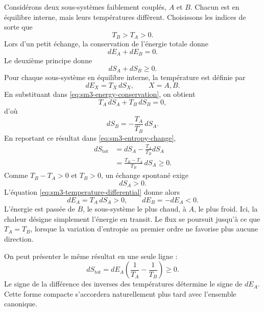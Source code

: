 Considérons deux sous-systèmes faiblement couplés, \(A\) et \(B\). Chacun est en équilibre interne, mais leurs températures diffèrent. Choisissons les indices de sorte que
\begin{equation}
 T_B>T_A>0.
 \label{eq:sm3-temperature-order}
\end{equation}
Lors d’un petit échange, la conservation de l’énergie totale donne
\begin{equation}
 dE_A+dE_B=0.
 \label{eq:sm3-energy-conservation}
\end{equation}
Le deuxième principe donne
\begin{equation}
 dS_A+dS_B\geq0.
 \label{eq:sm3-entropy-change}
\end{equation}
Pour chaque sous-système en équilibre interne, la température est définie par
\begin{equation}
 dE_X=T_X\,dS_X,
 \qquad X=A,B.
 \label{eq:sm3-temperature-differential}
\end{equation}
En substituant dans \eqref{eq:sm3-energy-conservation}, on obtient
\begin{equation}
 T_A\,dS_A+T_B\,dS_B=0,
\end{equation}
d’où
\begin{equation}
 dS_B=-\frac{T_A}{T_B}\,dS_A.
 \label{eq:sm3-dsb}
\end{equation}
En reportant ce résultat dans \eqref{eq:sm3-entropy-change},
\begin{align}
 dS_{\mathrm{tot}}
 &=dS_A-\frac{T_A}{T_B}dS_A\\
 &=\frac{T_B-T_A}{T_B}\,dS_A\geq0.
 \label{eq:sm3-flow-entropy}
\end{align}
Comme \(T_B-T_A>0\) et \(T_B>0\), un échange spontané exige
\[
 dS_A>0.
\]
L’équation \eqref{eq:sm3-temperature-differential} donne alors
\begin{equation}
 dE_A=T_A\,dS_A>0,
 \qquad
 dE_B=-dE_A<0.
 \label{eq:sm3-hot-to-cold}
\end{equation}
L’énergie est passée de \(B\), le sous-système le plus chaud, à \(A\), le plus froid. Ici, la chaleur désigne simplement l’énergie en transit. Le flux se poursuit jusqu’à ce que \(T_A=T_B\), lorsque la variation d’entropie au premier ordre ne favorise plus aucune direction.

On peut présenter le même résultat en une seule ligne :
\begin{equation}
 dS_{\mathrm{tot}}
 =dE_A\left(\frac{1}{T_A}-\frac{1}{T_B}\right)\geq0.
 \label{eq:sm3-compact-flow}
\end{equation}
Le signe de la différence des inverses des températures détermine le signe de \(dE_A\). Cette forme compacte s’accordera naturellement plus tard avec l’ensemble canonique.

